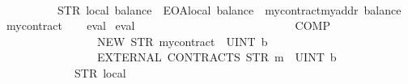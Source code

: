 \begin{isabellebody}
\ \ \ \ \ \ \ \ \ \ \ \ {\isacharbrackleft}{\kern0pt}{\isacharbrackright}{\kern0pt}\isanewline
\ \ \ \ \ \ \ \ {\isacharequal}{\kern0pt}\ STR\ {\isacharprime}{\kern0pt}{\isacharprime}{\kern0pt}local{\isacharcolon}{\kern0pt}\ balance{\isacharequal}{\kern0pt}{\isacharequal}{\kern0pt}{}{}\ {\isacharminus}{\kern0pt}\ EOA{\isasymnewline}{}{\isachardot}{\kern0pt}local{\isacharcolon}{\kern0pt}\ balance{\isacharequal}{\kern0pt}{\isacharequal}{\kern0pt}{}{}\ {\isacharminus}{\kern0pt}\ mycontract{\isacharparenleft}{\kern0pt}{\isacharparenright}{\kern0pt}{\isasymnewline}myaddr{\isacharcolon}{\kern0pt}\ balance{\isacharequal}{\kern0pt}{\isacharequal}{\kern0pt}{}{}{}\ {\isacharminus}{\kern0pt}\ mycontract{\isacharparenleft}{\kern0pt}{\isacharparenright}{\kern0pt}{\isacharprime}{\kern0pt}{\isacharprime}{\kern0pt}{\isachardoublequoteclose}\isanewline
%
\isadelimproof
\ \ %
\endisadelimproof
%
\isatagproof
{}\isamarkupfalse%
\ eval%
\endisatagproof
{\isafoldproof}%
%
\isadelimproof
\isanewline
%
\endisadelimproof
\isanewline
{}\isamarkupfalse%
\ {\isachardoublequoteopen}eval{}\ {}{}{}{}\isanewline
\ \ \ \ \ \ \ \ \ \ \ \ {\isacharparenleft}{\kern0pt}\isanewline
\ \ \ \ \ \ \ \ \ \ \ \ \ \ COMP\isanewline
\ \ \ \ \ \ \ \ \ \ \ \ \ \ \ \ {\isacharparenleft}{\kern0pt}NEW\ {\isacharparenleft}{\kern0pt}STR\ {\isacharprime}{\kern0pt}{\isacharprime}{\kern0pt}mycontract{\isacharprime}{\kern0pt}{\isacharprime}{\kern0pt}{\isacharparenright}{\kern0pt}\ {\isacharbrackleft}{\kern0pt}{\isacharbrackright}{\kern0pt}\ {\isacharparenleft}{\kern0pt}UINT\ b{}{}{}\ {}{}{\isacharparenright}{\kern0pt}{\isacharparenright}{\kern0pt}\isanewline
\ \ \ \ \ \ \ \ \ \ \ \ \ \ \ \ {\isacharparenleft}{\kern0pt}EXTERNAL\ CONTRACTS\ {\isacharparenleft}{\kern0pt}STR\ {\isacharprime}{\kern0pt}{\isacharprime}{\kern0pt}m{}{\isacharprime}{\kern0pt}{\isacharprime}{\kern0pt}{\isacharparenright}{\kern0pt}\ {\isacharbrackleft}{\kern0pt}{\isacharbrackright}{\kern0pt}\ {\isacharparenleft}{\kern0pt}UINT\ b{}{}{}\ {}{\isacharparenright}{\kern0pt}{\isacharparenright}{\kern0pt}\isanewline
\ \ \ \ \ \ \ \ \ \ \ \ {\isacharparenright}{\kern0pt}\isanewline
\ \ \ \ \ \ \ \ \ \ \ \ {\isacharparenleft}{\kern0pt}STR\ {\isacharprime}{\kern0pt}{\isacharprime}{\kern0pt}local{\isacharprime}{\kern0pt}{\isacharprime}{\kern0pt}{\isacharparenright}{\kern0pt}\isanewline

\end{isabellebody}
